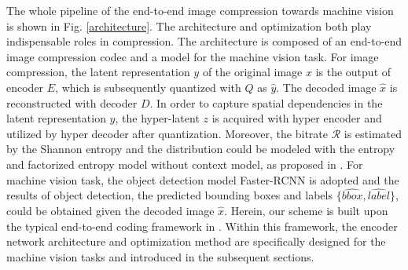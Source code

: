 \documentclass[transmag]{IEEEtran}
\begin{document}
The whole pipeline of the end-to-end image compression towards machine vision is shown in Fig. \ref{architecture}. The architecture and optimization both play indispensable roles in compression. The architecture is composed of an end-to-end image compression codec and a model for the machine vision task. For image compression, the latent representation $y$ of the original image $x$ is the output of encoder $E$, which is subsequently quantized with $Q$ as $\hat{y}$. The decoded image $\hat{x}$ is reconstructed with decoder $D$. In order to capture spatial dependencies in the latent representation $y$, the hyper-latent $z$ is acquired with hyper encoder and utilized by hyper decoder after quantization. Moreover, the bitrate $\mathcal{R}$ is estimated by the Shannon entropy and the distribution could be modeled with the entropy and factorized entropy model without context model, as proposed in \cite{minnen2018joint}.
For machine vision task, the object detection model Faster-RCNN \cite{ren2015faster} is adopted and the results of object detection, the predicted bounding boxes and labels $\{\hat{bbox}, \hat{label}\}$, could be obtained given the decoded image $\hat{x}$. Herein, our scheme is built upon the typical end-to-end coding framework in \cite{minnen2018joint}. Within this framework, the encoder network architecture and optimization method are specifically designed for the machine vision tasks and introduced in the subsequent sections. 
\end{document}
